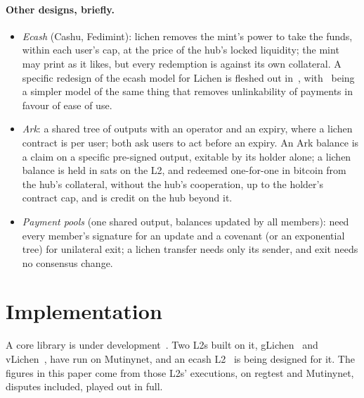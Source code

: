 \documentclass[11pt]{article}
\begin{document}
\paragraph{Other designs, briefly.}
\begin{itemize}[leftmargin=1.5em]
\item \emph{Ecash} (Cashu, Fedimint): lichen removes the mint's power to
  take the funds, within each user's cap, at the price of the hub's
  locked liquidity; the mint may print as it likes, but every redemption
  is against its own collateral. A specific redesign of the ecash model for Lichen is fleshed out in~\cite{lichenecash}, with~\cite{glichen} being a simpler model of the same thing that removes unlinkability of payments in favour of ease of use.
\item \emph{Ark}: a shared tree of outputs with an operator and an
  expiry, where a lichen contract is per user; both ask users to act
  before an expiry. An Ark balance is a claim on a specific pre-signed
  output, exitable by its holder alone; a lichen balance is held in sats
  on the L2, and redeemed one-for-one in bitcoin from the
  hub's collateral, without the hub's cooperation, up to the holder's
  contract cap, and is credit on the hub beyond it.
\item \emph{Payment pools} (one shared output, balances updated by all
  members): need every member's signature for an update and a covenant
  (or an exponential tree) for unilateral exit; a lichen transfer needs
  only its sender, and exit needs no consensus change.
\end{itemize}

\section{Implementation}
\label{sec:status}

A core library is under development~\cite{lichencode}. Two L2s built on it, gLichen~\cite{glichencode} and vLichen~\cite{vlichencode}, have run on Mutinynet, and an ecash L2~\cite{lichenecash} is being designed for it. The figures in this paper come from those L2s' executions, on regtest and Mutinynet, disputes included, played out in full.
\end{document}
